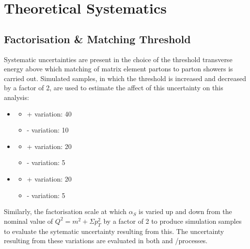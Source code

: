 
\section{Theoretical Systematics}
\label{s:Theoretical Systematics}
\subsection{Factorisation \& Matching Threshold}
\label{ss:factorisation_and_matching_threshold}
Systematic uncertainties are present in the choice of the threshold transverse energy above which matching of
matrix element partons to parton showers is carried out. Simulated samples, in which the threshold is
increased and decreased by a factor of 2, are used to estimate the affect of this uncertainty on this
analysis:

\begin{itemize}
  \item \ttbar
  \begin{itemize}
    \item + variation: 40\GeV
    \item - variation: 10\GeV
  \end{itemize}
  
  \item \WpJets
  \begin{itemize}
    \item + variation: 20\GeV
    \item - variation: 5\GeV
  \end{itemize}

  \item \ZpJets
  \begin{itemize}
    \item + variation: 20\GeV
    \item - variation: 5\GeV
  \end{itemize}
\end{itemize}

Similarly, the factorisation scale at which $\alpha_{S}$ is varied up and down from the nominal value of
$Q^{2} = m^{2} + \Sigma p_{T}^{2}$ by a factor of 2 to produce simulation samples to evaluate the sytematic
uncertainty resulting from this. The uncertainty resulting from these variations are evaluated in both \ttbar
and \W/\ZpJets processes.


